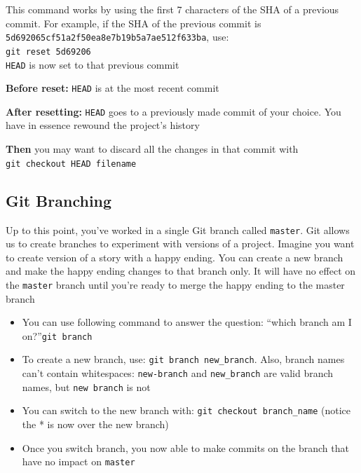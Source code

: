 \documentclass[a4paper, 12pt]{article}
\begin{document}
This command works by using the first 7 characters of the SHA of a previous commit. For example, if the SHA of the previous commit is\\ \verb|5d692065cf51a2f50ea8e7b19b5a7ae512f633ba|, use:\\
\verb|git reset 5d69206|\\
\verb|HEAD| is now set to that previous commit

\textbf{Before reset:} \verb|HEAD| is at the most recent commit

\textbf{After resetting:} \verb|HEAD| goes to a previously made commit of your choice. You have in essence rewound the project's history

\textbf{Then} you may want to discard all the changes in that commit with\\ \verb|git checkout HEAD filename|



\subsection{Git Branching}
Up to this point, you've worked in a single Git branch called \verb|master|. Git allows us to create branches to experiment with versions of a project. Imagine you want to create version of a story with a happy ending. You can create a new branch and make the happy ending changes to that branch only. It will have no effect on the \verb|master| branch until you're ready to merge the happy ending to the master branch

\begin{itemize}
\item You can use following command to answer the question: “which branch am I on?”\verb|git branch|

\item To create a new branch, use: \verb|git branch new_branch|. Also, branch names can't contain whitespaces: \verb|new-branch| and \verb|new_branch| are valid branch names, but \verb|new branch| is not

\item You can switch to the new branch with: \verb|git checkout branch_name| (notice the * is now over the new branch)

\item Once you switch branch, you now able to make commits on the branch that have no impact on \verb|master|

\end{itemize}
\end{document}

